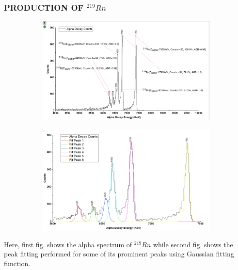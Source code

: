 \documentclass[12pt]{article}
\begin{document}
\subsubsection{PRODUCTION OF $^{219}Rn$}
\begin{figure}[h]
\centering
 \begin{subfigure}
\centering
\includegraphics[scale=0.5]{Rn219.png}
\end{subfigure}
\hfill
\begin{subfigure}
\centering
\includegraphics[scale=0.5]{Rn219(Peak Fitting).png}
\end{subfigure}
\label{First fig shows the alpha spectrum of Rn 219 and second fig shows the peak fitting for its prominent peaks.}
\end{figure}
Here, first fig. shows the alpha spectrum of $^{219}Rn$ while second fig. shows the peak fitting performed for some of its prominent peaks using Gaussian fitting function.
\clearpage
\end{document}
